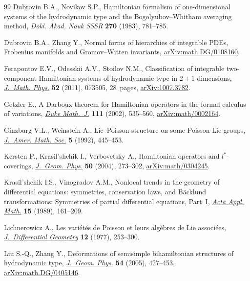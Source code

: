 \documentclass[10pt,a4paper]{amsart}
\numberwithin{equation}{section}
\begin{document}
\begin{thebibliography}{99}
Dubrovin B.A., Novikov S.P., Hamiltonian formalism of one-dimensional systems
 of the hydrodynamic type and the {B}ogolyubov--{W}hitham averaging method,
 \textit{Dokl. Akad. Nauk SSSR} \textbf{270} (1983), 781--785.

Dubrovin B.A., Zhang Y., Normal forms of hierarchies of integrable {PDE}s,
 {F}robenius manifolds and {G}romov--{W}itten invariants,
 \href{https://arxiv.org/abs/math.DG/0108160}{arXiv:math.DG/0108160}.

Ferapontov E.V., Odesskii A.V., Stoilov N.M., Classification of integrable
 two-component {H}amiltonian systems of hydrodynamic type in {$2+1$}
 dimensions, \href{https://doi.org/10.1063/1.3602081}{\textit{J.~Math. Phys.}} \textbf{52} (2011), 073505, 28~pages,
 \href{https://arxiv.org/abs/1007.3782}{arXiv:1007.3782}.

Getzler E., A {D}arboux theorem for {H}amiltonian operators in the formal
 calculus of variations, \href{https://doi.org/10.1215/S0012-7094-02-11136-3}{\textit{Duke Math.~J.}} \textbf{111} (2002), 535--560,
 \href{https://arxiv.org/abs/math/0002164}{arXiv:math/0002164}.

Ginzburg V.L., Weinstein A., Lie--{P}oisson structure on some {P}oisson {L}ie
 groups, \href{https://doi.org/10.2307/2152773}{\textit{J.~Amer. Math. Soc.}} \textbf{5} (1992), 445--453.

Kersten P., Krasil'shchik I., Verbovetsky A., Hamiltonian operators and
 {$l^*$}-coverings, \href{https://doi.org/10.1016/j.geomphys.2003.09.010}{\textit{J.~Geom. Phys.}} \textbf{50} (2004), 273--302,
 \href{https://arxiv.org/abs/math/0304245}{arXiv:math/0304245}.

Krasil'shchik I.S., Vinogradov A.M., Nonlocal trends in the geometry of
 differential equations: symmetries, conservation laws, and {B}\"acklund
 transformations: Symmetries of partial differential equations, Part~{I},
 \href{https://doi.org/10.1007/BF00131935}{\textit{Acta Appl. Math.}} \textbf{15} (1989), 161--209.

Lichnerowicz A., Les vari\'et\'es de {P}oisson et leurs alg\`ebres de {L}ie
 associ\'ees, \href{https://doi.org/10.4310/jdg/1214433987}{\textit{J.~Differential Geometry}} \textbf{12} (1977), 253--300.

Liu S.-Q., Zhang Y., Deformations of semisimple bihamiltonian structures of
 hydrodynamic type, \href{https://doi.org/10.1016/j.geomphys.2004.11.003}{\textit{J.~Geom. Phys.}} \textbf{54} (2005), 427--453,
 \href{https://arxiv.org/abs/math.DG/0405146}{arXiv:math.DG/0405146}.


\end{thebibliography}
\end{document}
